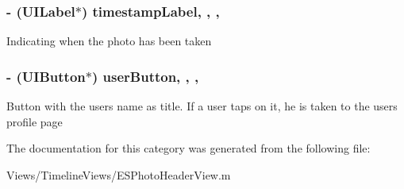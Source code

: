 \subsubsection[{timestamp\+Label}]{\setlength{\rightskip}{0pt plus 5cm}-\/ (U\+I\+Label$\ast$) timestamp\+Label\hspace{0.3cm}{\ttfamily [read]}, {\ttfamily [write]}, {\ttfamily [nonatomic]}, {\ttfamily [strong]}}\label{category_e_s_photo_header_view_07_08_a9e9e377aec46d409e2dc1bb144d20cc4}
Indicating when the photo has been taken \hypertarget{category_e_s_photo_header_view_07_08_a47115a5bbaac43864584552b5c4a7085}{}
\subsubsection[{user\+Button}]{\setlength{\rightskip}{0pt plus 5cm}-\/ (U\+I\+Button$\ast$) user\+Button\hspace{0.3cm}{\ttfamily [read]}, {\ttfamily [write]}, {\ttfamily [nonatomic]}, {\ttfamily [strong]}}\label{category_e_s_photo_header_view_07_08_a47115a5bbaac43864584552b5c4a7085}
Button with the user\textquotesingle{}s name as title. If a user taps on it, he is taken to the user\textquotesingle{}s profile page 

The documentation for this category was generated from the following file\+:\begin{DoxyCompactItemize}
\item 
Views/\+Timeline\+Views/E\+S\+Photo\+Header\+View.\+m\end{DoxyCompactItemize}
